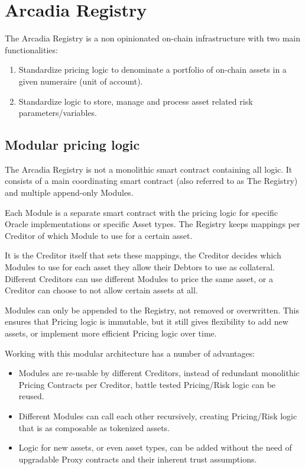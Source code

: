 \documentclass[sigconf,nonacm]{acmart}
\begin{document}
\section{Arcadia Registry}
\label{sec:arcadia-registry}

The Arcadia Registry is a non opinionated on-chain infrastructure with two main functionalities:
\begin{enumerate}
    \item Standardize pricing logic to denominate a portfolio of on-chain assets in a given numeraire (unit of account).
    \item Standardize logic to store, manage and process asset related risk parameters/variables.
\end{enumerate}

\subsection{Modular pricing logic}
\label{subsec:modular-pricing-logic}
The Arcadia Registry is not a monolithic smart contract containing all logic.
It consists of a main coordinating smart contract (also referred to as The Registry) and multiple append-only Modules.

Each Module is a separate smart contract with the pricing logic for specific Oracle implementations or specific Asset types.
The Registry keeps mappings per Creditor of which Module to use for a certain asset.

It is the Creditor itself that sets these mappings, the Creditor decides which Modules to use for each asset they allow their Debtors to use as collateral.
Different Creditors can use different Modules to price the same asset, or a Creditor can choose to not allow certain assets at all.

Modules can only be appended to the Registry, not removed or overwritten.
This ensures that Pricing logic is immutable, but it still gives flexibility to add new assets, or implement more efficient Pricing logic over time.

Working with this modular architecture has a number of advantages:
\begin{itemize}
    \item Modules are re-usable by different Creditors, instead of redundant monolithic Pricing Contracts per Creditor, battle tested Pricing/Risk logic can be reused.
    \item Different Modules can call each other recursively, creating Pricing/Risk logic that is as composable as tokenized assets.
    \item Logic for new assets, or even asset types, can be added without the need of upgradable Proxy contracts and their inherent trust assumptions.
\end{itemize}
\end{document}
